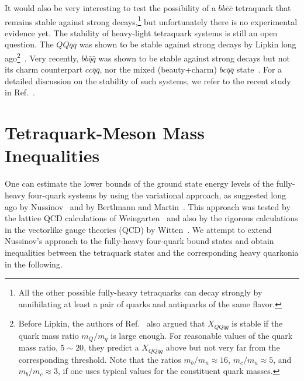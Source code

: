 \documentclass[twocolumn,showpacs,superscriptaddress,preprintnumbers,nofootinbib,prd]{revtex4-1}
\begin{document}
It would also be very interesting to test the possibility of a $bb\bar c\bar c$
tetraquark that remains stable against strong decays,\footnote{All the other
possible fully-heavy tetraquarks can decay strongly by annihilating at least
a pair of quarks and antiquarks of the same flavor.} but unfortunately
there is no experimental evidence yet.
The stability of heavy-light tetraquark systems is still an open question.
The $QQ \bar{q} \bar{q}$ was shown to be stable against strong decays by Lipkin long ago\footnote{Before Lipkin,
the authors of Ref.~\cite{Ader:1981db} also argued
that $X_{QQ \bar{q} \bar{q}}$ is stable if the quark mass ratio $m_Q/m_q$ is large enough.
For reasonable values of the quark mass ratio, $5\sim20$, they predict a
$X_{QQ \bar{q} \bar{q}}$ above but not very far from the corresponding threshold.
Note that the ratios $m_b/m_u\approx 16$, $m_c/m_u\approx 5$, and $m_b/m_c\approx 3$,
if one uses typical values for the constituent quark masses.}~\cite{lipkin85}.
Very recently, %
$bb \bar{q} \bar{q}$ was shown to be stable against strong decays but not its charm
counterpart $cc \bar{q} \bar{q}$, nor the mixed (beauty+charm) $bc \bar{q} \bar{q}$
state~\cite{Karliner:2017qjm,Eichten:2017ffp}.
For a detailed discussion on the stability of such systems, we refer to the
recent study in Ref.~\cite{Czarnecki:2017vco}.


\section{Tetraquark-Meson Mass Inequalities}
\label{massInqSec}

One can estimate the lower bounds of the ground state energy levels of the
fully-heavy four-quark systems by using the variational approach, as suggested
long ago by Nussinov~\cite{Nussinov:1983vh} and by Bertlmann and Martin~\cite{Bertlmann:1979zs}.
This approach was tested by the lattice QCD calculations of
Weingarten~\cite{Weingarten:1983uj} and also by the rigorous calculations in the
vectorlike gauge theories (QCD) by Witten~\cite{Witten:1983ut}.
We attempt to extend Nussinov's approach to the fully-heavy four-quark bound
states and obtain inequalities between the tetraquark states and the
corresponding heavy
quarkonia in the following.
\end{document}
